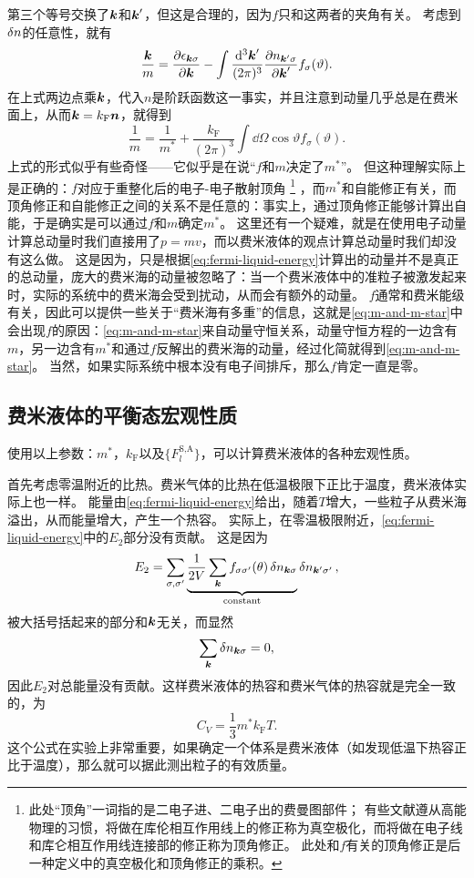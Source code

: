 第三个等号交换了$\vb*{k}$和$\vb*{k}'$，但这是合理的，因为$f$只和这两者的夹角有关。
考虑到$\var{n}$的任意性，就有
\[
    \frac{\vb*{k}}{m} = \pdv{\epsilon_{\vb*{k} \sigma}}{\vb*{k}} - \int \frac{\dd[3]{\vb*{k}'}}{(2\pi)^3} \pdv{n_{\vb*{k}' \sigma}}{\vb*{k}'} f_{\sigma}(\vartheta).
\]
在上式两边点乘$\vb*{k}$，代入$n$是阶跃函数这一事实，并且注意到动量几乎总是在费米面上，从而$\vb*{k} = k_\text{F} \vb*{n}$，就得到
\begin{equation}
    \frac{1}{m} = \frac{1}{m^*} + \frac{k_\text{F}}{(2\pi)^3} \int \dd{\Omega} \cos \vartheta f_\sigma(\vartheta).
    \label{eq:m-and-m-star}
\end{equation}
上式的形式似乎有些奇怪——它似乎是在说“$f$和$m$决定了$m^*$”。
但这种理解实际上是正确的：$f$对应于重整化后的电子-电子散射顶角%
\footnote{
    此处“顶角”一词指的是二电子进、二电子出的费曼图部件；
    有些文献遵从高能物理的习惯，将做在库伦相互作用线上的修正称为真空极化，而将做在电子线和库仑相互作用线连接部的修正称为顶角修正。
    此处和$f$有关的顶角修正是后一种定义中的真空极化和顶角修正的乘积。
}%
，而$m^*$和自能修正有关，而顶角修正和自能修正之间的关系不是任意的：事实上，通过顶角修正能够计算出自能，于是确实是可以通过$f$和$m$确定$m^*$。
这里还有一个疑难，就是在使用电子动量计算总动量时我们直接用了$p=mv$，而以费米液体的观点计算总动量时我们却没有这么做。
这是因为，只是根据\eqref{eq:fermi-liquid-energy}计算出的动量并不是真正的总动量，庞大的费米海的动量被忽略了：当一个费米液体中的准粒子被激发起来时，实际的系统中的费米海会受到扰动，从而会有额外的动量。
$f$通常和费米能级有关，因此可以提供一些关于“费米海有多重”的信息，这就是\eqref{eq:m-and-m-star}中会出现$f$的原因：\eqref{eq:m-and-m-star}来自动量守恒关系，动量守恒方程的一边含有$m$，另一边含有$m^*$和通过$f$反解出的费米海的动量，经过化简就得到\eqref{eq:m-and-m-star}。
当然，如果实际系统中根本没有电子间排斥，那么$f$肯定一直是零。

\subsection{费米液体的平衡态宏观性质}

使用以上参数：$m^*$，$k_\text{F}$以及$\{F_l^\text{S,A}\}$，可以计算费米液体的各种宏观性质。

首先考虑零温附近的比热。费米气体的比热在低温极限下正比于温度，费米液体实际上也一样。
能量由\eqref{eq:fermi-liquid-energy}给出，随着$T$增大，一些粒子从费米海溢出，从而能量增大，产生一个热容。
实际上，在零温极限附近，\eqref{eq:fermi-liquid-energy}中的$E_2$部分没有贡献。
这是因为
\[
    E_2 = \sum_{\sigma, \sigma'} \underbrace{\frac{1}{2V} \sum_{\vb*{k}} f_{\sigma \sigma'}(\theta) \var{n}_{\vb*{k} \sigma}}_{\text{constant}} \var{n}_{\vb*{k}' \sigma'},
\]
被大括号括起来的部分和$\vb*{k}$无关，而显然
\[
    \sum_{\vb*{k}} \var{n}_{\vb*{k} \sigma} = 0,
\]
因此$E_2$对总能量没有贡献。这样费米液体的热容和费米气体的热容就是完全一致的，为
\begin{equation}
    C_V = \frac{1}{3} m^* k_\text{F} T.
\end{equation}
这个公式在实验上非常重要，如果确定一个体系是费米液体（如发现低温下热容正比于温度），那么就可以据此测出粒子的有效质量。

